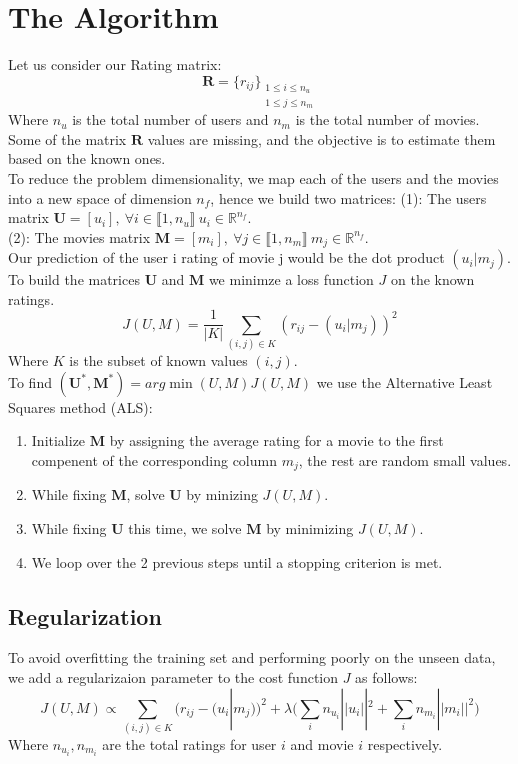 \documentclass[10pt]{article}
\begin{document}
\section{The Algorithm}
Let us consider our Rating matrix:
\[\mathbf R=\{r_{ij}\}_{\substack{1\leq i \leq n_u\\1\leq j \leq n_m}}\]
Where $n_u$ is the total number of users and $n_m$ is the total number of movies.\\
Some of the matrix $\mathbf R$ values are missing, and the objective is to estimate them based on the known ones.\\
To reduce the problem dimensionality, we map each of the users and the movies into a new space of dimension $n_f$, hence we build two matrices:
(1): The users matrix $\mathbf U=[u_i], \: \forall i\in \llbracket 1,n_u\rrbracket \: u_i\in \mathbb R^{n_f}$.\\
(2): The movies matrix $\mathbf M=[m_i], \: \forall j\in \llbracket 1,n_m\rrbracket \: m_j\in \mathbb R^{n_f}$.\\
Our prediction of the user i rating of movie j would be the dot product $(u_i|m_j)$.\\
To build the matrices $\mathbf U$ and $\mathbf M$ we minimze a loss function $J$ on the known ratings.
\[J(U,M)=\frac{1}{|K|}\sum\limits_{(i,j)\in K}(r_{ij}-(u_i|m_j))^2\]
Where $K$ is the subset of known values $(i,j)$.\\
To find $(\mathbf{U^*,M^*})=arg \min\limits{(U,M)} J(U,M)$ we use the Alternative Least Squares method (ALS):
\begin{enumerate}[leftmargin=1cm, label=\alph *)]
\item Initialize $\mathbf M$ by assigning the average rating for a movie to the first compenent of the corresponding column $m_j$, the rest are random small values.
\item While fixing $\mathbf M$, solve $\mathbf U$ by minizing $J(U,M)$.
\item While fixing $\mathbf U$ this time, we solve $\mathbf M$ by minimizing $J(U,M)$.
\item We loop over the 2 previous steps until a stopping criterion is met.
\end{enumerate}
\subsection{Regularization}
To avoid overfitting the training set and performing poorly on the unseen data, we add a regularizaion parameter to the cost function $J$ as follows:
\[J(U,M)\propto \sum\limits_{(i,j)\in K}(r_{ij}-(u_i|m_j))^2+\lambda\big(\sum\limits_in_{u_i}||u_i||^2+\sum\limits_in_{m_i}||m_i||^2\big)\]
Where $n_{u_i}, n_{m_i}$ are the total ratings for user $i$ and movie $i$ respectively.
\end{document}
